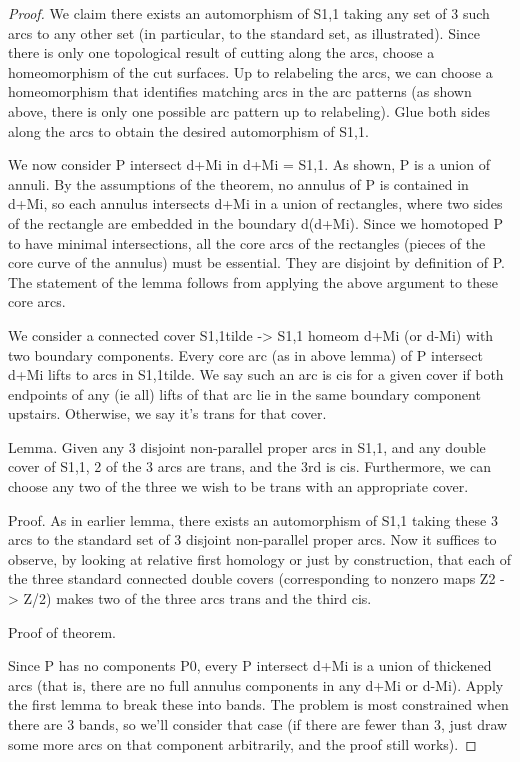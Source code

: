 \documentclass[12pt]{amsart}
\theoremstyle{definition}
\begin{document}
\begin{proof}
We claim there exists an automorphism of S1,1 taking any set of 3 such arcs to
any other set (in particular, to the standard set, as illustrated). Since there
is only one topological result of cutting along the arcs, choose
a homeomorphism of the cut surfaces. Up to relabeling the arcs, we can choose
a homeomorphism that identifies matching arcs in the arc patterns (as shown
above, there is only one possible arc pattern up to relabeling). Glue both
sides along the arcs to obtain the desired automorphism of S1,1.

We now consider P intersect d+Mi in d+Mi = S1,1. As shown, P is a union of
annuli. By the assumptions of the theorem, no annulus of P is contained in
d+Mi, so each annulus intersects d+Mi in a union of rectangles, where two sides
of the rectangle are embedded in the boundary d(d+Mi). Since we homotoped P to
have minimal intersections, all the core arcs of the rectangles (pieces of the
core curve of the annulus) must be essential. They are disjoint by definition
of P. The statement of the lemma follows from applying the above argument to
these core arcs.

We consider a connected cover S1,1tilde -> S1,1 homeom d+Mi (or d-Mi) with two
boundary components. Every core arc (as in above lemma) of P intersect d+Mi
lifts to arcs in S1,1tilde. We say such an arc is cis for a given cover if
both endpoints of any (ie all) lifts of that arc lie in the same boundary
component upstairs. Otherwise, we say it's trans for that cover.

Lemma. Given any 3 disjoint non-parallel proper arcs in S1,1, and any double
cover of S1,1, 2 of the 3 arcs are trans, and the 3rd is cis.
Furthermore, we can choose any two of the three we wish to be trans with an
appropriate cover.

Proof. As in earlier lemma, there exists an automorphism of S1,1
taking these 3 arcs to the standard set of 3 disjoint non-parallel proper arcs.
Now it suffices to observe, by looking at relative first homology or just by
construction, that each of the three standard connected double covers
(corresponding to nonzero maps Z2 -> Z/2) makes two of the three arcs trans and
the third cis.

Proof of theorem.

Since P has no components P0, every P intersect d+Mi is a union of thickened
arcs (that is, there are no full annulus components in any d+Mi or d-Mi). Apply
the first lemma to break these into bands. The problem is most constrained when
there are 3 bands, so we'll consider that case (if there are fewer than 3, just
draw some more arcs on that component arbitrarily, and the proof still works).


\end{proof}
\end{document}
